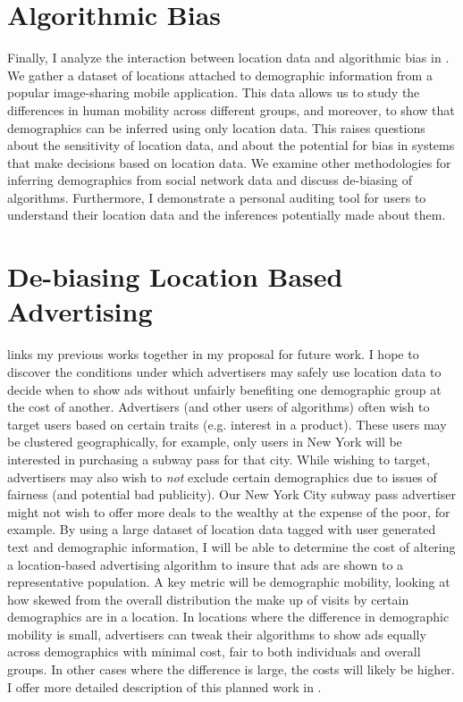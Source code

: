 \section{Algorithmic Bias}
Finally, I analyze the interaction between location data and algorithmic bias in .
We gather a dataset of locations attached to demographic information from a popular image-sharing mobile application.
This data allows us to study the differences in human mobility across different groups, and moreover, to show that demographics can be inferred using only location data.
This raises questions about the sensitivity of location data, and about the potential for bias in systems that make decisions based on location data.
We examine other methodologies for inferring demographics from social network data and discuss de-biasing of algorithms.
Furthermore, I demonstrate a personal auditing tool for users to understand their location data and the inferences potentially made about them.

\section{De-biasing Location Based Advertising}
 links my previous works together in my proposal for future work.
I hope to discover the conditions under which advertisers may safely use location data to decide when to show ads without unfairly benefiting one demographic group at the cost of another.
Advertisers (and other users of algorithms) often wish to target users based on certain traits (e.g. interest in a product).
These users may be clustered geographically, for example, only users in New York will be interested in purchasing a subway pass for that city.
While wishing to target, advertisers may also wish to \emph{not} exclude certain demographics due to issues of fairness (and potential bad publicity).
Our New York City subway pass advertiser might not wish to offer more deals to the wealthy at the expense of the poor, for example.
By using a large dataset of location data tagged with user generated text and demographic information, I will be able to determine the cost of altering a location-based advertising algorithm to insure that ads are shown to a representative population.
A key metric will be demographic mobility, looking at how skewed from the overall distribution the make up of visits by certain demographics are in a location.
In locations where the difference in demographic mobility is small, advertisers can tweak their algorithms to show ads equally across demographics with minimal cost, fair to both individuals and overall groups.
In other cases where the difference is large, the costs will likely be higher.
I offer more detailed description of this planned work in .




